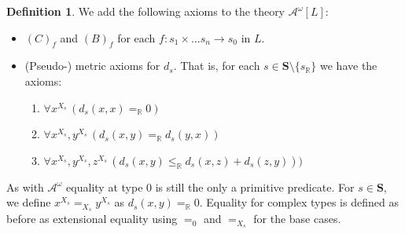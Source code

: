 \documentclass[11pt]{amsart}
\newtheorem{proposition}[theorem]{Proposition}
\theoremstyle{definition}
\newtheorem{definition}[theorem]{Definition}
\theoremstyle{remark}
\def\RR{\mathbb{R}}
\begin{document}
\begin{definition}
   We add the following axioms to the theory  $\mathcal{A}^\omega[L]$:
   \begin{itemize}
       \item $(C)_f$ and $(B)_f$ for each $f:s_1 \times \ldots s_n \to s_0 $ in $L$.
       \item (Pseudo-) metric axioms for $d_s$. That is, for each $s \in \mathbf{S}\setminus \{s_\RR\}$ we have the axioms:
       \begin{enumerate}
           \item $\forall x^{X_s}\,(d_s(x,x)=_\RR 0)$
            \item $\forall x^{X_s},y^{X_s}\,(d_s(x,y)=_\RR d_s(y,x))$
            \item $\forall x^{X_s},y^{X_s},z^{X_s}\,(d_s(x,y)\le_\RR d_s(x,z)+d_s(z,y)))$
       \end{enumerate}
   \end{itemize}
   As with $\mathcal{A}^\omega$ equality at type 0 is still the only a primitive predicate. For $s \in \mathbf{S}$, we define $x^{X_s} =_{X_s} y^{X_s}$ as $d_s(x,y)=_\RR 0$. Equality for complex types is defined as before as extensional equality using $=_0$ and $=_{X_s}$ for the base cases.
\end{definition}
\end{document}
